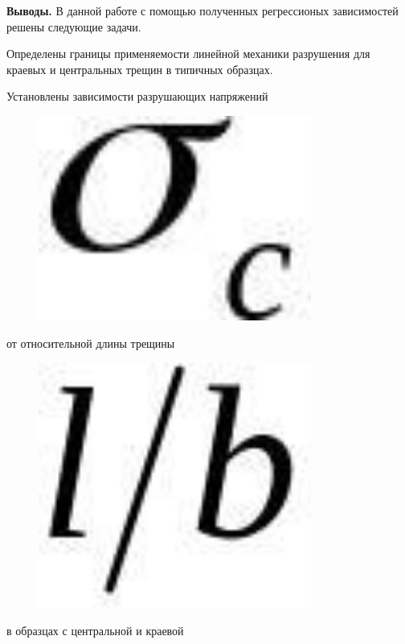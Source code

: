 {\bfseries Выводы.} В данной работе с помощью полученных регрессионых
зависимостей решены следующие задачи.

Определены границы применяемости линейной механики разрушения для
краевых и центральных трещин в типичных образцах.

Установлены зависимости разрушающих напряжений
\begin{figure}[H]
	\centering
	\includegraphics[width=0.8\textwidth]{assets/1247}
	\caption*{}
\end{figure} от относительной длины трещины
\begin{figure}[H]
	\centering
	\includegraphics[width=0.8\textwidth]{assets/1248}
	\caption*{}
\end{figure} в образцах с центральной и краевой
